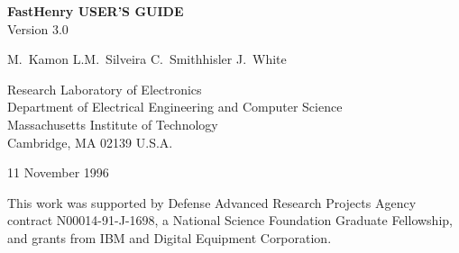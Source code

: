 
\pagestyle{headings}
\setlength{\oddsidemargin}{0.25in}      %
\setlength{\evensidemargin}{0.00in}     %
\setlength{\topmargin}{0.0in}           %
\setlength{\textwidth}{6.25in}          %
\setlength{\textheight}{9in}            %
\addtolength{\topmargin}{-\headheight}  %
\addtolength{\topmargin}{-\headsep}     %





\begin{titlepage}
\vskip 36pt
\begin{center}
{\bf FastHenry USER'S GUIDE}\\
Version 3.0
\end{center}

\vskip 18pt
\begin{center}
M.\ Kamon \hspace*{0.5in} L.M.\ Silveira \hspace*{0.5in} C.\ Smithhisler
\hspace*{0.5in} J.\ White
\end{center}

\vskip 18pt
\begin{center}
Research Laboratory of Electronics \\
Department of Electrical Engineering and Computer Science \\
Massachusetts Institute of Technology \\
Cambridge, MA  02139 U.S.A.
\end{center}
\vskip 18pt
\begin{center}
11 November 1996
\end{center}

\vfill
\noindent This work was supported by Defense Advanced Research Projects Agency
contract N00014-91-J-1698, a National Science Foundation Graduate
Fellowship, and grants from IBM and Digital Equipment Corporation.
\end{titlepage}

\begin{titlepage}
$\;$
\end{titlepage}



\newpage

\tableofcontents
\newpage

